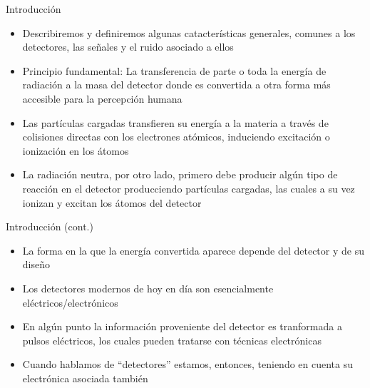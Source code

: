 \documentclass{beamer}
\begin{document}
\begin{frame}
\begin{block}{Introducci\'on}
\begin{itemize}
\item Describiremos y definiremos algunas catacter\'isticas generales, comunes a los
detectores, las señales y el ruido asociado a ellos
\item Principio fundamental: \alert{La transferencia de parte o toda la energ\'ia
de radiaci\'on a la masa del detector donde es convertida a otra forma m\'as
accesible para la percepci\'on humana}
\item Las part\'iculas cargadas transfieren su energ\'ia a la materia a trav\'es de
colisiones directas con los electrones at\'omicos, induciendo
{\color{blue}excitaci\'on} o {\color{blue}ionizaci\'on} en los \'atomos
\item La radiaci\'on neutra, por otro lado, primero debe producir alg\'un tipo de
reacci\'on en el detector producciendo part\'iculas cargadas, las cuales a su vez
ionizan y excitan los \'atomos del detector
\end{itemize}
\end{block}
\end{frame} 

\begin{frame}
\begin{block}{Introducci\'on (cont.)}
\begin{itemize}
\item La forma en la que la energ\'ia convertida aparece {\color{blue}depende del detector y de
su diseño}
\item Los detectores modernos de hoy en d\'ia son esencialmente
el\'ectricos/electr\'onicos
\item En alg\'un punto la informaci\'on proveniente del detector es
tranformada a pulsos el\'ectricos, los cuales pueden tratarse con t\'ecnicas
electr\'onicas
\item Cuando hablamos de ``detectores'' estamos, entonces, teniendo en cuenta su
electr\'onica asociada tambi\'en
\end{itemize}
\end{block}
\end{frame} 
\end{document}
